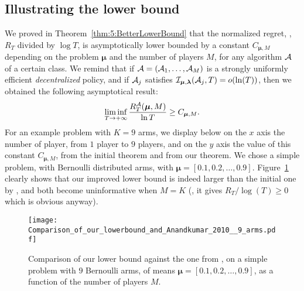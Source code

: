 \label{app:5:moreplots}



\subsection*{Illustrating the lower bound}
\label{app:5:illustrationLowerBound}


We proved in Theorem~\ref{thm:5:BetterLowerBound} that the normalized regret, \ie, $R_T$ divided by
$\log T$, is asymptotically lower bounded by a constant $C_{\boldsymbol{\mu}, M}$
depending on the problem $\boldsymbol{\mu}$ and the number of players $M$, for any algorithm $\mathcal{A}$ of a certain class.
%
We remind that if  $\mathcal{A}=(\mathcal{A}_1,\dots,\mathcal{A}_M)$ is a strongly uniformly efficient \emph{decentralized} policy,
and if $\mathcal{A}_j$ satisfies $\mathcal{I}_{\bm{\mu},\bm{\lambda}}(\mathcal{A}_j,T) = \mathop{}\mathopen{}o\mathopen{}\left(\ln(T)\right)$, then we obtained the following asymptotical result:
%
\begin{equation}
  \mathop{\lim\inf}\limits_{T \to +\infty} \frac{R_T^{\mathcal{A}}(\boldsymbol{\mu}, M)}{\ln T} \geq C_{\boldsymbol{\mu}, M}.
\end{equation}
%
For an example problem with $K = 9$ arms, we display below on the $x$ axis
the number of player, from $1$ player to $9$ players, and on the
$y$ axis the value of this constant $C_{\boldsymbol{\mu}, M}$, from the initial
theorem and from our theorem.
We chose a simple problem, with Bernoulli
distributed arms, with $\boldsymbol{\mu} = [0.1, 0.2, \dots, 0.9]$.
%
Figure~\ref{fig:5:CompLowerBounds} clearly shows that our improved lower bound is indeed larger than the initial one by \cite{Zhao10},
and both become uninformative when $M=K$ (\ie, it gives $R_T / \log(T) \geq 0$ which is obvious anyway).

\begin{figure}[h!]
  \centering
  \texttt{[image: Comparison\_of\_our\_lowerbound\_and\_Anandkumar\_2010\_\_9\_arms.pdf]}
  \caption[Comparison of our lower bound against the one from \cite{Zhao10}.]{Comparison of our lower bound against the one from \cite{Zhao10}, on a simple problem with $9$ Bernoulli arms, of means $\boldsymbol{\mu} = [0.1, 0.2, \dots, 0.9]$, as a function of the number of players $M$.}
  \label{fig:5:CompLowerBounds}
\end{figure}




